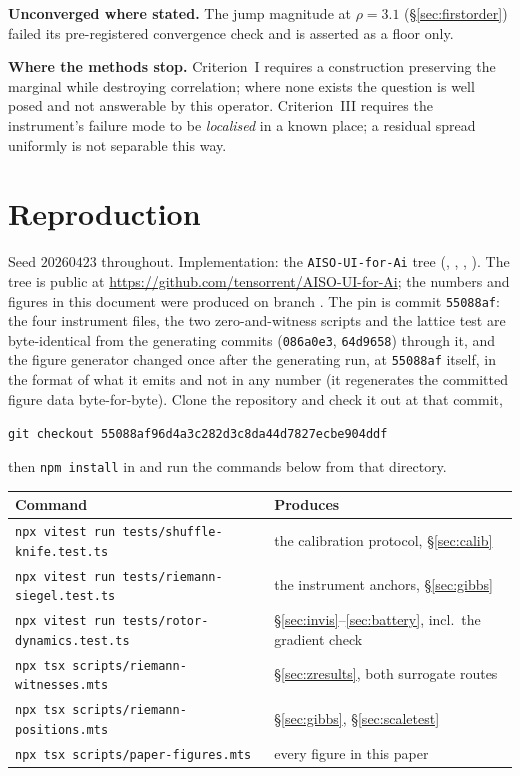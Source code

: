 \documentclass[11pt]{article}
\theoremstyle{remark}
\begin{document}
\textbf{Unconverged where stated.} The jump magnitude at $\rho=3.1$
(\S\ref{sec:firstorder}) failed its pre-registered convergence check and is asserted as
a floor only.

\textbf{Where the methods stop.} Criterion~I requires a construction preserving the
marginal while destroying correlation; where none exists the question is well posed and
not answerable by this operator. Criterion~III requires the instrument's failure mode to
be \emph{localised} in a known place; a residual spread uniformly is not separable this
way.

\section{Reproduction}\label{sec:repro}

Seed $20260423$ throughout. Implementation: the \texttt{AISO-UI-for-Ai} tree
(, , , ).
The tree is public at \url{https://github.com/tensorrent/AISO-UI-for-Ai}; the numbers and figures in this document were produced on branch . The pin is commit \texttt{55088af}: the four instrument files, the two zero-and-witness scripts and the lattice test are byte-identical from the generating commits (\texttt{086a0e3}, \texttt{64d9658}) through it, and the figure generator changed once after the generating run, at \texttt{55088af} itself, in the format of what it emits and not in any number (it regenerates the committed figure data byte-for-byte). Clone the repository and check it out at that commit,
\begin{center}\small\texttt{git checkout 55088af96d4a3c282d3c8da44d7827ecbe904ddf}\end{center}
then \texttt{npm install} in  and run the commands below from that directory.

\begin{center}\small
\begin{tabular}{ll}
\toprule
Command & Produces \\
\midrule
\texttt{npx vitest run tests/shuffle-knife.test.ts} & the calibration protocol, \S\ref{sec:calib} \\
\texttt{npx vitest run tests/riemann-siegel.test.ts} & the instrument anchors, \S\ref{sec:gibbs} \\
\texttt{npx vitest run tests/rotor-dynamics.test.ts} & \S\ref{sec:invis}--\ref{sec:battery}, incl.\ the gradient check \\
\texttt{npx tsx scripts/riemann-witnesses.mts} & \S\ref{sec:zresults}, both surrogate routes \\
\texttt{npx tsx scripts/riemann-positions.mts} & \S\ref{sec:gibbs}, \S\ref{sec:scaletest} \\
\texttt{npx tsx scripts/paper-figures.mts} & every figure in this paper \\
\bottomrule
\end{tabular}
\end{center}
\end{document}
